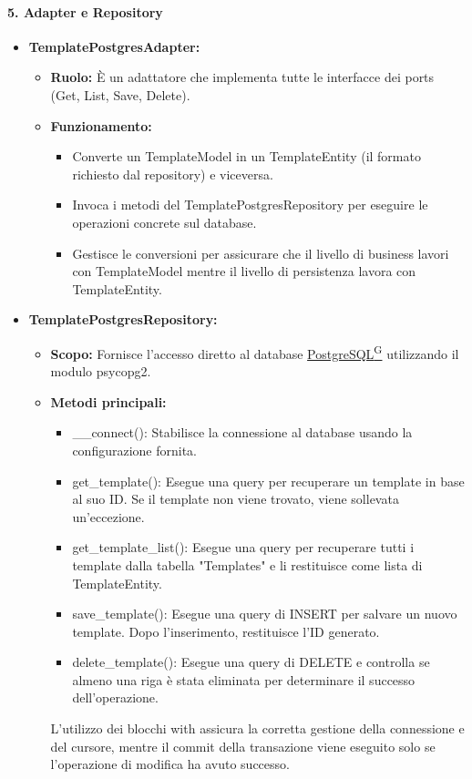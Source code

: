     \paragraph{5. Adapter e Repository}
    \begin{itemize}
        \item \textbf{TemplatePostgresAdapter:}
        \begin{itemize}
            \item \textbf{Ruolo:} È un adattatore che implementa tutte le interfacce dei ports (Get, List, Save, Delete).
            \item \textbf{Funzionamento:}
            \begin{itemize}
                \item Converte un TemplateModel in un TemplateEntity (il formato richiesto dal repository) e viceversa.
                \item Invoca i metodi del TemplatePostgresRepository per eseguire le operazioni concrete sul database.
                \item Gestisce le conversioni per assicurare che il livello di business lavori con TemplateModel mentre il livello di persistenza lavora con TemplateEntity.
            \end{itemize}
        \end{itemize}
        \item \textbf{TemplatePostgresRepository:}
        \begin{itemize}
            \item \textbf{Scopo:} Fornisce l’accesso diretto al database \href{https://code7crusaders.github.io/docs/PB/documentazione_interna/glossario.html#postgresql}{PostgreSQL\textsuperscript{G}} utilizzando il modulo psycopg2.
            \item \textbf{Metodi principali:}
            \begin{itemize}
                \item \_\_connect(): Stabilisce la connessione al database usando la configurazione fornita.
                \item get\_template(): Esegue una query per recuperare un template in base al suo ID. Se il template non viene trovato, viene sollevata un’eccezione.
                \item get\_template\_list(): Esegue una query per recuperare tutti i template dalla tabella "Templates" e li restituisce come lista di TemplateEntity.
                \item save\_template(): Esegue una query di INSERT per salvare un nuovo template. Dopo l’inserimento, restituisce l’ID generato.
                \item delete\_template(): Esegue una query di DELETE e controlla se almeno una riga è stata eliminata per determinare il successo dell’operazione.
            \end{itemize}
            L’utilizzo dei blocchi with assicura la corretta gestione della connessione e del cursore, mentre il commit della transazione viene eseguito solo se l’operazione di modifica ha avuto successo.
        \end{itemize}
    \end{itemize}
    
